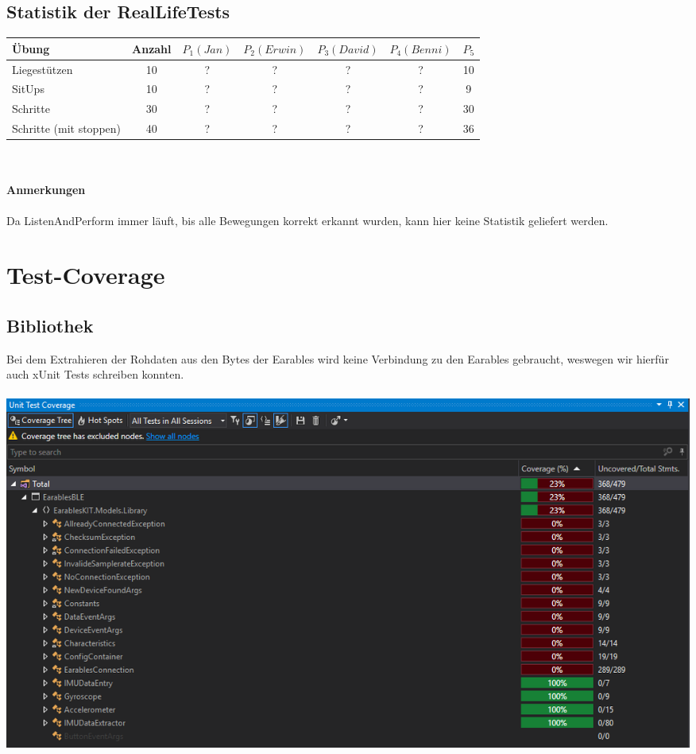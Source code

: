 \documentclass[a4paper,12pt]{article}
\begin{document}
\subsection{Statistik der RealLifeTests}
\begin{tabular}{ | l | c | c | c | c | c | c |}
	\hline
	\textbf{Übung} & \textbf{Anzahl} & $P_1(Jan)$ & $P_2(Erwin)$ & $P_3(David)$ & $P_4(Benni)$ & $P_5$\\
	\hline
	Liegestützen & 10 & ? & ? & ? & ? & 10 \\
	\hline
	SitUps & 10 & ? & ? & ? & ? & 9 \\
	\hline
	Schritte & 30 & ? & ? & ? & ? & 30 \\
	\hline
	Schritte (mit stoppen) & 40 & ? & ? & ? & ? & 36 \\
	\hline
\end{tabular}\\
\paragraph{Anmerkungen}
Da ListenAndPerform immer läuft, bis alle Bewegungen korrekt erkannt wurden, kann hier keine Statistik geliefert werden.


\section{Test-Coverage}

\subsection{Bibliothek}
Bei dem Extrahieren der Rohdaten aus den Bytes der Earables wird keine Verbindung zu den Earables gebraucht, weswegen wir hierfür auch xUnit Tests schreiben konnten.
\\ \\ 
\includegraphics[width=1\textwidth]{./bilder/BibTestCoverage/Testcoverage.PNG}
\end{document}
